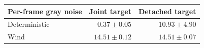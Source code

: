 \begin{tabular}{lrr}
\toprule
\rowcolor{Navy!8}
Per-frame gray noise & Joint target & Detached target \\
\midrule
Deterministic & $0.37\pm0.05$ & $10.93\pm4.90$ \\
\rowcolor{JEPA!10}
Wind & $14.51\pm0.12$ & $14.51\pm0.07$ \\
\bottomrule
\end{tabular}
